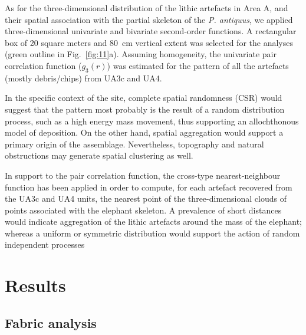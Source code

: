 \documentclass[preprint,authoryear,times]{elsarticle} %
\begin{document}

As for the three-dimensional distribution of the lithic artefacts in Area A, and their spatial association with the partial skeleton of the \emph{P. antiquus}, we applied three-dimensional univariate and bivariate second-order functions. A rectangular box of 20 square meters and 80~cm vertical extent was selected for the analyses (green outline in Fig.~\ref{fig:11}a). Assuming homogeneity, the univariate pair correlation function ($g_3(r)$) was estimated for the pattern of all the artefacts (mostly debris/chips) from UA3c and UA4.

In the specific context of the site, complete spatial randomness (CSR) would suggest that the pattern most probably is the result of a random distribution process, such as a high energy mass movement, thus supporting an allochthonous model of deposition. On the other hand, spatial aggregation would support a primary origin of the assemblage. Nevertheless, topography and natural obstructions may generate spatial clustering as well.

In support to the pair correlation function, the cross-type nearest-neighbour function has been applied in order to compute, for each artefact recovered from the UA3c and UA4 units, the nearest point of the three-dimensional clouds of points associated with the elephant skeleton. A prevalence of short distances would indicate aggregation of the lithic artefacts around the mass of the elephant; whereas a uniform or symmetric distribution would support the action of random independent processes

\section{Results}

\subsection{Fabric analysis}
\end{document}
